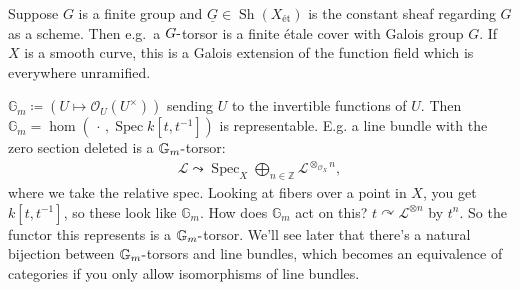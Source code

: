 \begin{example}[?]

Suppose \(G\) is a finite group and
\(\underline{G} \in {\operatorname{Sh}}(X_\text{ét})\) is the constant
sheaf regarding \(G\) as a scheme. Then e.g.~a \(G{\hbox{-}}\)torsor is
a finite étale cover with Galois group \(G\). If \(X\) is a smooth
curve, this is a Galois extension of the function field which is
everywhere unramified.

\end{example}

\begin{example}[?]

\({\mathbb{G}}_m \coloneqq(U\mapsto {\mathcal{O}}_U(U^{\times}))\)
sending \(U\) to the invertible functions of \(U\). Then
\({\mathbb{G}}_m = \hom({\,\cdot\,}, \operatorname{Spec}k[t, t^{-1}])\)
is representable. E.g. a line bundle with the zero section deleted is a
\({\mathbb{G}}_m{\hbox{-}}\)torsor:
\begin{align*}  
\mathcal{L} \leadsto \operatorname{Spec}_X \bigoplus_{n\in {\mathbb{Z}}} \mathcal{L}^{\otimes_{{\mathcal{O}}_X} n}
,\end{align*}
where we take the relative spec. Looking at fibers over a point in
\(X\), you get \(k[t, t^{-1}]\), so these look like \({\mathbb{G}}_m\).
How does \({\mathbb{G}}_m\) act on this?
\(t\curvearrowright\mathcal{L}^{\otimes n}\) by \(t^n\). So the functor
this represents is a \({\mathbb{G}}_m{\hbox{-}}\)torsor. We'll see later
that there's a natural bijection between
\({\mathbb{G}}_m{\hbox{-}}\)torsors and line bundles, which becomes an
equivalence of categories if you only allow isomorphisms of line
bundles.

\end{example}

